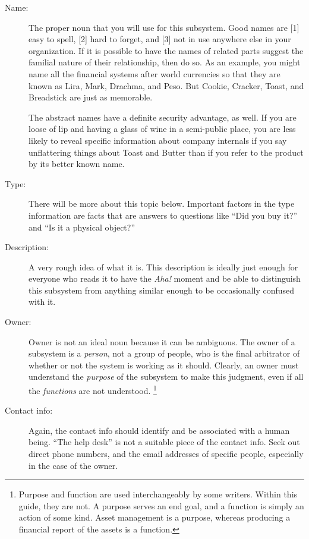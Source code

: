 \documentclass[11pt,letterpaper,twosided]{memoir}
\begin{document}
\begin{description}
\item[Name:] The proper noun that you will use for this subsystem.
Good names are [1] easy to spell, [2] hard to forget, and [3] not
in use anywhere else in your organization. If it is possible to
have the names of related parts suggest the familial nature of their
relationship, then do so. As an example, you might name all the
financial systems after world currencies so that they are known as
Lira, Mark, Drachma, and Peso. But Cookie, Cracker, Toast, and
Breadstick are just as memorable.

The abstract names have a definite security advantage, as well. If
you are loose of lip and having a glass of wine in a semi-public
place, you are less likely to reveal specific information about
company internals if you say unflattering things about Toast and
Butter than if you refer to the product by its better known name.

\item[Type:] There will be more about this topic below. Important 
factors in the type information are facts that are answers to questions
like ``Did you buy it?'' and ``Is it a physical object?''

\item[Description:] A very rough idea of what it is. This description
is ideally just enough for everyone who reads it to have the
\emph{Aha!} moment and be able to distinguish this subsystem from
anything similar enough to be occasionally confused with it.

\item[Owner:] Owner is not an ideal noun because it can be ambiguous.
The owner of a subsystem is a \emph{person}, not a group of people,
who is the final arbitrator of whether or not the system is working
as it should. Clearly, an owner must understand the \emph{purpose}
of the subsystem to make this judgment, even if all the \emph{functions}
are not understood.  \footnote{Purpose and function are used
interchangeably by some writers.  Within this guide, they are not.
A purpose serves an end goal, and a function is simply an action
of some kind. Asset management is a purpose, whereas producing a
financial report of the assets is a function.}

\item[Contact info:] Again, the contact info should identify and
be associated with a human being. ``The help desk'' is not a suitable
piece of the contact info. Seek out direct phone numbers, and the
email addresses of specific people, especially in the case of the
owner.


\end{description}
\end{document}
